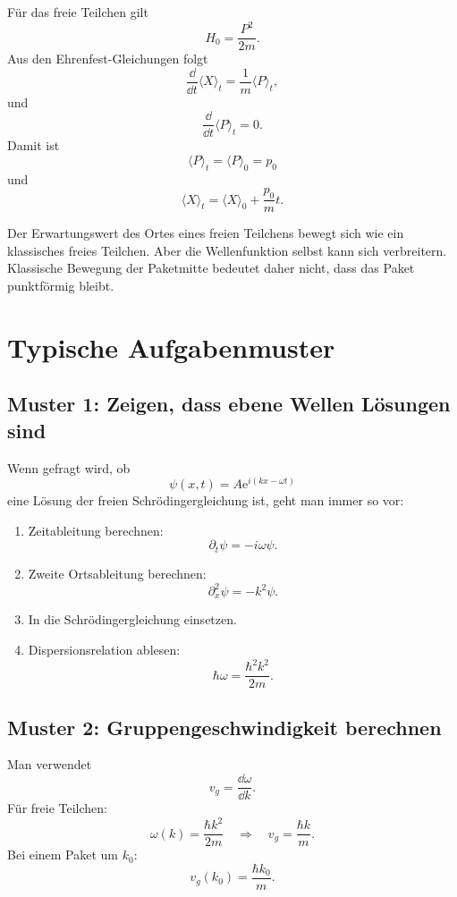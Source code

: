 Für das freie Teilchen gilt
\[
    H_0=\frac{P^2}{2m}.
\]
Aus den Ehrenfest-Gleichungen folgt
\[
    \frac{\dd}{\dd t}\langle X\rangle_t=\frac{1}{m}\langle P\rangle_t,
\]
und
\[
    \frac{\dd}{\dd t}\langle P\rangle_t=0.
\]
Damit ist
\[
    \langle P\rangle_t=\langle P\rangle_0=p_0
\]
und
\[
    \langle X\rangle_t=\langle X\rangle_0+\frac{p_0}{m}t.
\]

\begin{conceptbox}
Der Erwartungswert des Ortes eines freien Teilchens bewegt sich wie ein klassisches freies Teilchen. Aber die Wellenfunktion selbst kann sich verbreitern. Klassische Bewegung der Paketmitte bedeutet daher nicht, dass das Paket punktförmig bleibt.
\end{conceptbox}

\section{Typische Aufgabenmuster}

\subsection{Muster 1: Zeigen, dass ebene Wellen Lösungen sind}

Wenn gefragt wird, ob
\[
    \psi(x,t)=A\mathrm{e}^{i(kx-\omega t)}
\]
eine Lösung der freien Schrödingergleichung ist, geht man immer so vor:
\begin{enumerate}
    \item Zeitableitung berechnen:
    \[
        \partial_t\psi=-i\omega\psi.
    \]
    \item Zweite Ortsableitung berechnen:
    \[
        \partial_x^2\psi=-k^2\psi.
    \]
    \item In die Schrödingergleichung einsetzen.
    \item Dispersionsrelation ablesen:
    \[
        \hbar\omega=\frac{\hbar^2k^2}{2m}.
    \]
\end{enumerate}

\subsection{Muster 2: Gruppengeschwindigkeit berechnen}

Man verwendet
\[
    v_g=\frac{\dd\omega}{\dd k}.
\]
Für freie Teilchen:
\[
    \omega(k)=\frac{\hbar k^2}{2m}
    \quad\Rightarrow\quad
    v_g=\frac{\hbar k}{m}.
\]
Bei einem Paket um $k_0$:
\[
    v_g(k_0)=\frac{\hbar k_0}{m}.
\]

